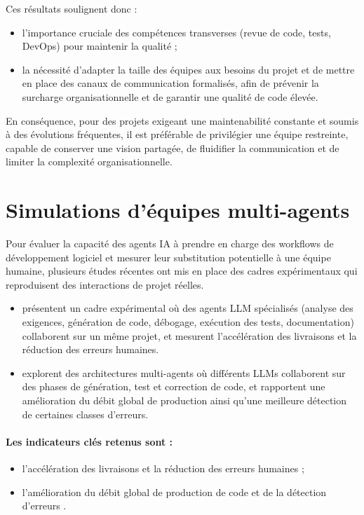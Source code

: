 Ces résultats soulignent donc :
\begin{itemize}
  \item l’importance cruciale des compétences transverses (revue de code, tests, DevOps) pour maintenir la qualité ;
  \item la nécessité d’adapter la taille des équipes aux besoins du projet et de mettre en place des canaux de communication formalisés, afin de prévenir la surcharge organisationnelle et de garantir une qualité de code élevée.
\end{itemize}

En conséquence, pour des projets exigeant une maintenabilité constante et soumis à des évolutions fréquentes, il est préférable de privilégier une équipe restreinte, capable de conserver une vision partagée, de fluidifier la communication et de limiter la complexité organisationnelle.

\section{Simulations d’équipes multi-agents}

Pour évaluer la capacité des agents IA à prendre en charge des workflows de développement logiciel et mesurer leur substitution potentielle à une équipe humaine, plusieurs études récentes ont mis en place des cadres expérimentaux qui reproduisent des interactions de projet réelles.

\begin{itemize}
  \item \textcite{ashraf_autonomous_2025} présentent un cadre expérimental où des agents LLM spécialisés (analyse des exigences, génération de code, débogage, exécution des tests, documentation) collaborent sur un même projet, et mesurent l’accélération des livraisons et la réduction des erreurs humaines.
%

\item \textcite{zahid_multi-agent_2024} explorent des architectures multi-agents où différents LLMs collaborent sur des phases de génération, test et correction de code, et rapportent une amélioration du débit global de production ainsi qu’une meilleure détection de certaines classes d’erreurs.
\end{itemize}

\paragraph{Les indicateurs clés retenus sont :}
\begin{itemize}
  \item l’accélération des livraisons et la réduction des erreurs humaines \parencite{ashraf_autonomous_2025};
  \item l’amélioration du débit global de production de code et de la détection d’erreurs \parencite{zahid_multi-agent_2024}.
\end{itemize}

